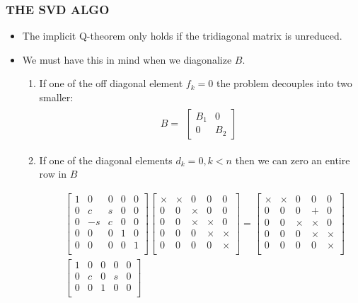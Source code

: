 \documentclass[a4paper,8pt]{beamer} %
\newcommand{\smatrix}[1]{\left[\begin{matrix} #1 \end{matrix}\right]}
\begin{document}
\begin{frame}%
\frametitle{THE SVD ALGO}
\begin{itemize}
	\item The implicit Q-theorem only holds if the tridiagonal matrix is unreduced. 
	\item We must have this in mind when we diagonalize $B$. 
		\begin{enumerate}
			\item
				If one of the off diagonal element $f_k=0$ the problem decouples into two smaller:
				\begin{align}
					B = 
					\begin{matrix}
						\smatrix{B_1 & 0 \\ 0 & B_2}
					\end{matrix}
				\end{align}
			\item If one of the diagonal elements $d_k=0, k<n$ then we can zero an entire row in $B$
				\begin{footnotesize}
				\begin{align}
						&\smatrix
						{
							1 	& 0 & 0 & 0 & 0   \\
							0 	& c & s & 0 & 0   \\
							0 	& -s & c & 0 & 0    \\
							0 & 0 & 0 & 1 & 0   \\
							0 & 0 & 0 & 0 & 1  \\
						}
						\smatrix
						{
							\times 	& \times & 0 & 0 & 0   \\
							0 	& 0 & \times & 0 & 0   \\
							0 	& 0 & \times & \times & 0    \\
							0 & 0 & 0 & \times & \times   \\
							0 & 0 & 0 & 0 & \times  \\
						}
						=
						\smatrix
						{
							\times 	& \times & 0 & 0 & 0   \\
							0 	& 0 & 0 & + & 0   \\
							0 	& 0 & \times & \times & 0    \\
							0 & 0 & 0 & \times & \times   \\
							0 & 0 & 0 & 0 & \times  \\
						}\\
						&\smatrix
						{
							1 & 0 & 0 & 0 & 0   \\
							0 & c & 0 & s & 0   \\
							0 & 0 & 1 & 0 & 0    \\
}
\end{align}
\end{footnotesize}
\end{enumerate}
\end{itemize}
\end{frame}
\end{document}
